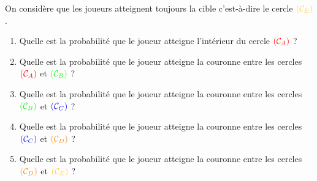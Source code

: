 \newpage


On considère que les joueurs atteignent toujours la cible c'est-à-dire le cercle $\textcolor{yellow}{(\mathcal{C}_E)}$.
\begin{enumerate}[label=G\arabic*)]
\item Quelle est la probabilité que le joueur atteigne l'intérieur du cercle $\textcolor{red}{(\mathcal{C}_A)}$ ?
\item Quelle est la probabilité que le joueur atteigne la couronne entre les cercles $\textcolor{red}{(\mathcal{C}_A)}$ et $\textcolor{lime}{(\mathcal{C}_B)}$ ?
\item Quelle est la probabilité que le joueur atteigne la couronne entre les cercles $\textcolor{lime}{(\mathcal{C}_B)}$ et $\textcolor{navy}{(\mathcal{C}_C)}$ ?
\item Quelle est la probabilité que le joueur atteigne la couronne entre les cercles $\textcolor{navy}{(\mathcal{C}_C)}$ et $\textcolor{orange}{(\mathcal{C}_D)}$ ?
\item Quelle est la probabilité que le joueur atteigne la couronne entre les cercles $\textcolor{orange}{(\mathcal{C}_D)}$ et $\textcolor{yellow}{(\mathcal{C}_E)}$ ?
\end{enumerate}
